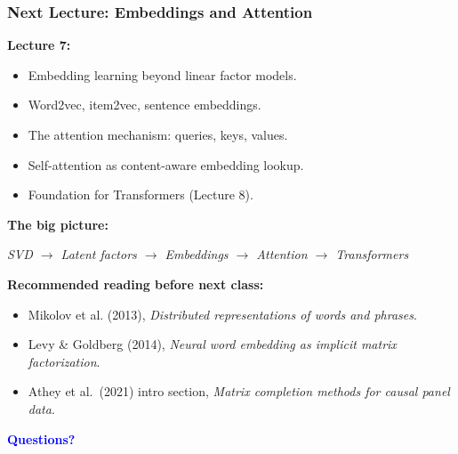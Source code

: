 \documentclass[notes,11pt, aspectratio=169]{beamer}
\begin{document}
\begin{frame}
\frametitle{Next Lecture: Embeddings and Attention}

\textbf{Lecture 7:}
\begin{itemize}
    \item Embedding learning beyond linear factor models.
    \item Word2vec, item2vec, sentence embeddings.
    \item The attention mechanism: queries, keys, values.
    \item Self-attention as content-aware embedding lookup.
    \item Foundation for Transformers (Lecture 8).
\end{itemize}

\vspace{8pt}
\textbf{The big picture:}
\begin{center}
\textit{SVD $\to$ Latent factors $\to$ Embeddings $\to$ Attention $\to$ Transformers}
\end{center}

\vspace{6pt}
\textbf{Recommended reading before next class:}
\begin{itemize}
    \item Mikolov et al. (2013), \emph{Distributed representations of words and phrases}.
    \item Levy \& Goldberg (2014), \emph{Neural word embedding as implicit matrix factorization}.
    \item Athey et al.\ (2021) intro section, \emph{Matrix completion methods for causal panel data}.
\end{itemize}

\vspace{6pt}
\begin{center}
\Large \textcolor{blue}{\textbf{Questions?}}
\end{center}
\end{frame}
\end{document}
